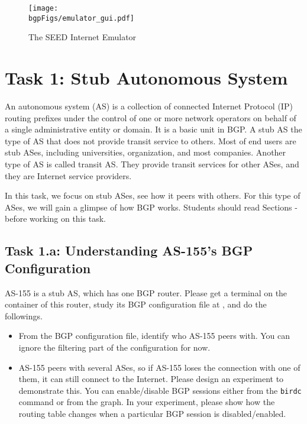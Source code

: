 \begin{figure}[htb]
  \begin{center}
    \texttt{[image: \\bgpFigs/emulator\_gui.pdf]}
  \end{center}
  \caption{The SEED Internet Emulator}
  \label{bgp:fig:emulator-map}
\end{figure}
 

\section{Task 1: Stub Autonomous System} 

An autonomous system (AS) is a collection of connected Internet Protocol (IP) routing prefixes
under the control of one or more network operators on behalf of a single administrative entity
or domain. It is a basic unit in BGP. 
A stub AS the type of AS that does not provide transit service to others.
Most of end users are stub ASes, including universities, organization,
and most companies. Another type of AS is called transit AS. They
provide transit services for other ASes, and they 
are Internet service providers.  

In this task, we focus on stub ASes, see how it peers with others. 
For this type of ASes, we will gain a glimpse of how BGP works. 
Students should read Sections \bgpintro - \bgpupdate 
before working on this task. 

\subsection{Task 1.a: Understanding AS-155's BGP Configuration} 

AS-155 is a stub AS, which has one BGP router. Please  
get a terminal on the container of this router, study its 
BGP configuration file at , and
do the followings.

\begin{itemize}
  \item From the BGP configuration file, identify who
    AS-155 peers with. You can ignore the filtering
    part of the configuration for now.

  \item AS-155 peers with several ASes, so if AS-155
    loses the connection with one of them, it can still connect
    to the Internet. Please design an experiment to 
    demonstrate this. You can enable/disable BGP sessions
    either from the \texttt{birdc} command or from the 
    graph.
    In your experiment, please show how the routing table changes when a particular 
    BGP session is disabled/enabled. 
\end{itemize}


